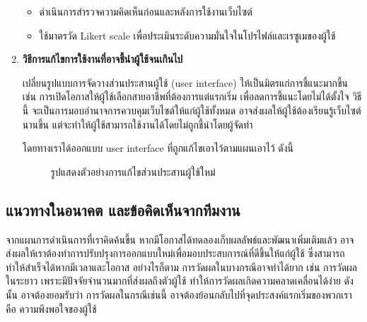 \begin{enumerate}
    \begin{itemize}
        \item ดำเนินการสำรวจความคิดเห็นก่อนและหลังการใช้งานเว็บไซต์
        \item ใช้มาตรวัด Likert scale เพื่อประเมินระดับความมั่นใจในโปรไฟล์และเรซูเมของผู้ใช้
    \end{itemize}

    \item \textbf{วิธีการแก้ไขการใช้งานที่อาจชี้นำผู้ใช้จนเกินไป}
    
    \par{
        เปลี่ยนรูปแบบการจัดวางส่วนประสานผู้ใช้ (user interface) ให้เป็นมิตรแก่การชี้แนะมากขึ้น เช่น การเปิดโอกาสให้ผู้ใช้เลือกสายอาชีพที่ต้องการแต่แรกเริ่ม เพื่อลดการชี้แนะโดยไม่ได้ตั้งใจ วิธีนี้ จะเป็นการมอบอำนาจการควบคุมเว็บไซต์ให้แก่ผู้ใช้ทั้งหมด อาจส่งผลให้ผู้ใช้ต้องเรียนรู้เว็บไซต์นานขึ้น แต่จะทำให้ผู้ใช้สามารถใช้งานได้โดยไม่ถูกชี้นำโดยผู้จัดทำ
    }

    โดยทางเราได้ออกแบบ user interface ที่ถูกแก้ไขเอาไว้ตามแผนเอาไว้ ดังนี้

    \begin{figure}[H]\centering
        \caption{รูปแสดงตัวอย่างการแก้ไขส่วนประสานผู้ใช้ใหม่}\label{fig:new-ui}
    \end{figure}

\end{enumerate}


\subsection{แนวทางในอนาคต และข้อคิดเห็นจากทีมงาน}

\par{
    จากแผนการดำเนินการที่เราคิดค้นขึ้น หากมีโอกาสได้ทดลองเก็บผลลัพธ์และพัฒนาเพิ่มเติมแล้ว อาจส่งผลให้เราต้องทำการปรับปรุงการออกแบบใหม่เพื่อมอบประสบการณ์ที่ดีขึ้นให้แก่ผู้ใช้ ซึ่งสามารถทำให้สำเร็จได้หากมีเวลาและโอกาส อย่างไรก็ตาม การวัดผลในบางกรณีอาจทำได้ยาก เช่น การวัดผลในระยาว เพราะมีปัจจัยจำนวนมากที่ส่งผลถึงตัวผู้ใช้ ทำให้การวัดผลเกิดความคลาดเคลื่อนได้ง่าย ดังนั้น อาจต้องยอมรับว่า การวัดผลในกรณีเช่นนี้ อาจต้องย้อนกลับไปที่จุดประสงค์แรกเริ่มของพวกเรา คือ ความพึงพอใจของผู้ใช้
}